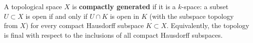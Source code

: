 A topological space $X$ is \textbf{compactly generated} if it is a $k$-space: a subset $U \subset X$ is open if and only if $U \cap K$ is open in $K$ (with the subspace topology from $X$) for every compact Hausdorff subspace $K \subset X$. Equivalently, the topology is final with respect to the inclusions of all compact Hausdorff subspaces.